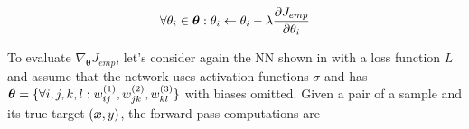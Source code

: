 
%


%


\begin{align}
 \forall \theta_i \in \boldsymbol{\theta} : \theta_i \leftarrow \theta_i - \lambda  \frac{\partial J_{emp} }{\partial \theta_i}
\label{eq:gradient_update}
\end{align}

To evaluate $\nabla_{\boldsymbol{\theta}} J_{emp}$, let's 
consider again the NN shown in \addfigure{\ref{fig:nn_typical_structure}} with a loss function $L$ and assume that the network uses activation functions $\sigma$ and has $\boldsymbol{\theta} = \{ \forall i,j,k,l : w^{(1)}_{ij}, w^{(2)}_{jk}, w^{(3)}_{kl}  \}$ with biases omitted. Given a pair of a sample and its true target $(\boldsymbol{x}, y)$, the forward pass computations are

